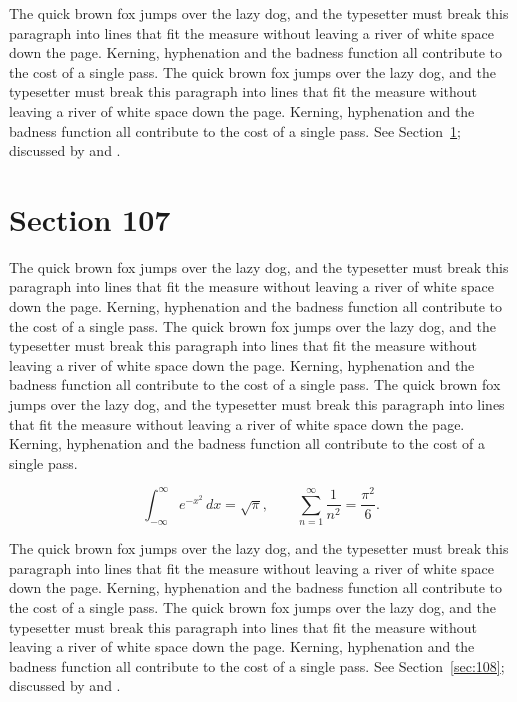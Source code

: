\documentclass{article}
\begin{document}
The quick brown fox jumps over the lazy dog, and the typesetter must break this paragraph into lines that fit the measure without leaving a river of white space down the page. Kerning, hyphenation and the badness function all contribute to the cost of a single pass. The quick brown fox jumps over the lazy dog, and the typesetter must break this paragraph into lines that fit the measure without leaving a river of white space down the page. Kerning, hyphenation and the badness function all contribute to the cost of a single pass. 
See Section~\ref{sec:107}; discussed by \textcite{k2} and \textcite{l4}.
\section{Section 107}
\label{sec:107}
The quick brown fox jumps over the lazy dog, and the typesetter must break this paragraph into lines that fit the measure without leaving a river of white space down the page. Kerning, hyphenation and the badness function all contribute to the cost of a single pass. The quick brown fox jumps over the lazy dog, and the typesetter must break this paragraph into lines that fit the measure without leaving a river of white space down the page. Kerning, hyphenation and the badness function all contribute to the cost of a single pass. The quick brown fox jumps over the lazy dog, and the typesetter must break this paragraph into lines that fit the measure without leaving a river of white space down the page. Kerning, hyphenation and the badness function all contribute to the cost of a single pass. 

\begin{equation}\label{eq:107}
\int_{-\infty}^{\infty} e^{-x^{2}}\,dx = \sqrt{\pi}, \qquad
\sum_{n=1}^{\infty} \frac{1}{n^{2}} = \frac{\pi^{2}}{6}.
\end{equation}

The quick brown fox jumps over the lazy dog, and the typesetter must break this paragraph into lines that fit the measure without leaving a river of white space down the page. Kerning, hyphenation and the badness function all contribute to the cost of a single pass. The quick brown fox jumps over the lazy dog, and the typesetter must break this paragraph into lines that fit the measure without leaving a river of white space down the page. Kerning, hyphenation and the badness function all contribute to the cost of a single pass. 
See Section~\ref{sec:108}; discussed by \textcite{k3} and \textcite{l5}.
\end{document}
